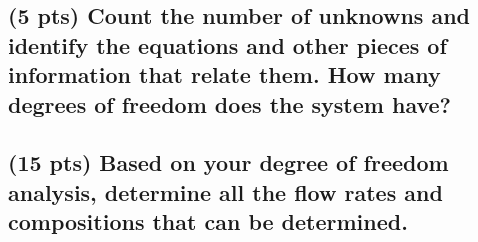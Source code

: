 \documentclass[11pt]{article}
\begin{document}
\subsection{(5 pts) Count the number of unknowns and identify the equations and other pieces of information that relate them.  How many degrees of freedom does the system have?}
\label{sec-3-2}
\newpage
\subsection{(15 pts) Based on your degree of freedom analysis, determine all the flow rates and compositions that can be determined.}
\label{sec-3-3}
\end{document}
